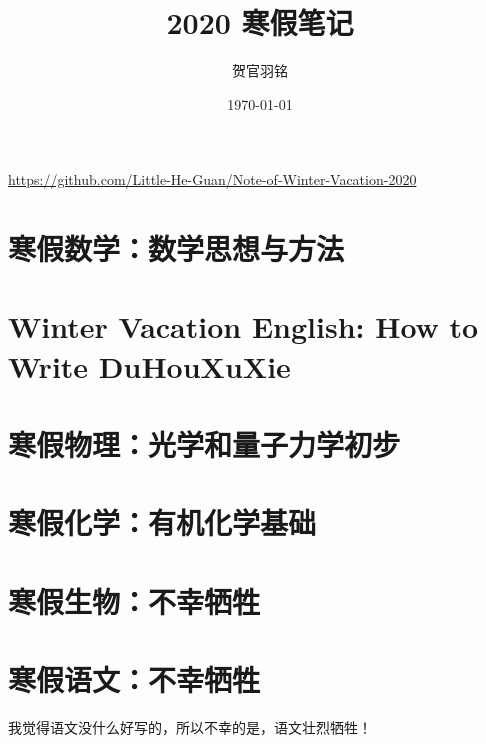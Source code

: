 \documentclass[UTF8]{ctexart}
\author{贺官羽铭}
\date{\today}
\title{2020 寒假笔记}
\begin{document}
\pagestyle{plain}


\newpage
\maketitle
\begin{center}
\url{https://github.com/Little-He-Guan/Note-of-Winter-Vacation-2020}
\end{center}

\newpage
{}


\newpage
\tableofcontents

\newpage


\newpage
\pagestyle{fancy}

\part{寒假数学：数学思想与方法}


\newpage
\part{Winter Vacation English: How to Write DuHouXuXie}


\newpage
\part{寒假物理：光学和量子力学初步}


\newpage
\part{寒假化学：有机化学基础}


\newpage
\part{寒假生物：不幸牺牲}


\newpage
\part{寒假语文：不幸牺牲}
我觉得语文没什么好写的，所以不幸的是，语文壮烈牺牲！

\newpage



\newpage
\listoffigures

\medskip
\listoftables
\end{document}
